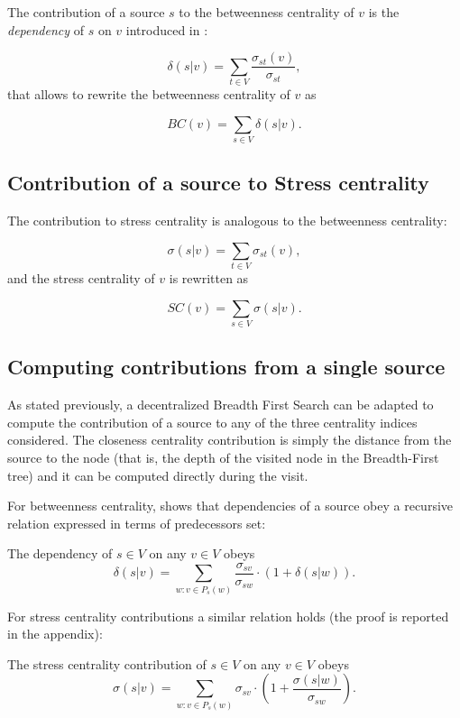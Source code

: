The contribution of a source $s$ to the betweenness centrality of $v$ is the \emph{dependency} of $s$ on $v$ introduced in \cite{brandes2001}:

\begin{equation}
\delta(s|v) = \sum_{t \in V} \frac{\sigma_{st}(v)}{\sigma_{st}},
\end{equation}
that allows to rewrite the betweenness centrality of $v$ as

\begin{equation*}
BC(v) = \sum_{s \in V} \delta(s|v).
\end{equation*}

\subsection*{Contribution of a source to Stress centrality}

The contribution to stress centrality is analogous to the betweenness centrality:

\begin{equation} \label{eq:contrib:sc}
\sigma(s|v) = \sum_{t \in V} \sigma_{st}(v),
\end{equation}
and the stress centrality of $v$ is rewritten as

\begin{equation*}
SC(v) = \sum_{s \in V} \sigma(s|v).
\end{equation*}

\subsection{Computing contributions from a single source}
\label{sec:recursive}

As stated previously, a decentralized Breadth First Search can be adapted to compute the contribution of a source to any of the three centrality indices considered. The closeness centrality contribution is simply the distance from the source to the node (that is, the depth of the visited node in the Breadth-First tree) and it can be computed directly during the visit.

For betweenness centrality, \cite{brandes2001} shows that dependencies of a source obey a recursive relation expressed in terms of predecessors set:
\begin{theorem}[Brandes, 2001]
\label{th:contrib:bc}
The dependency of $s \in V$ on any $v \in V$ obeys
\begin{equation} \label{eq:th:contrib:bc}
\delta(s|v) = \sum_{w : v \in P_s(w)} \frac{\sigma_{sv}}{\sigma_{sw}} \cdot (1 + \delta(s|w)) .
\end{equation}
\end{theorem}
For stress centrality contributions a similar relation holds (the proof is reported in the appendix):
\begin{theorem}
\label{th:contrib:sc}
The stress centrality contribution of $s \in V$ on any $v \in V$ obeys
\begin{equation} \label{eq:th:contrib:sc}
\sigma(s|v) = \sum_{w : v \in P_s(w)} \sigma_{sv} \cdot \left( 1 + \frac{\sigma(s|w)}{\sigma_{sw}} \right) .
\end{equation}
\end{theorem}

